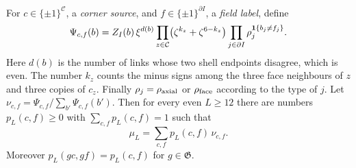 \begin{lemma}\label{lem:mixture}
For $c\in\{\pm1\}^{\mathcal C}$, a \emph{corner source}, and $f\in\{\pm1\}^{\partial I}$, a \emph{field label}, define
\begin{equation}\label{eq:Psi}
 \Psi_{c,f}(b)=Z_I(b)\,\xi^{d(b)}\prod_{z\in\mathcal C}\bigl(\zeta^{k_z}+\zeta^{6-k_z}\bigr)\prod_{j\in\partial I}\rho_j^{\mathbf 1\{b_j\ne f_j\}} .
\end{equation}
Here $d(b)$ is the number of links whose two shell endpoints disagree, which is even. The number $k_z$ counts the minus signs among the three face neighbours of $z$ and three copies of $c_z$. Finally $\rho_j=\rho_{\rm axial}$ or $\rho_{\rm face}$ according to the type of $j$. Let $\nu_{c,f}=\Psi_{c,f}/\sum_{b'}\Psi_{c,f}(b')$. Then for every even $L\ge12$ there are numbers $p_L(c,f)\ge0$ with $\sum_{c,f}p_L(c,f)=1$ such that
\begin{equation}\label{eq:mixture}
 \mu_L=\sum_{c,f}p_L(c,f)\,\nu_{c,f}.
\end{equation}
Moreover $p_L(gc,gf)=p_L(c,f)$ for $g\in\mathfrak G$.
\end{lemma}

